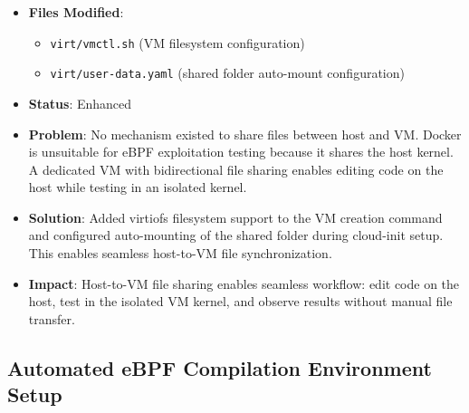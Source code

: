 \begin{itemize}
\item \textbf{Files Modified}:
\begin{itemize}
  \item \texttt{virt/vmctl.sh} (VM filesystem configuration)
  \item \texttt{virt/user-data.yaml} (shared folder auto-mount configuration)
\end{itemize}

\item \textbf{Status}: Enhanced

\item \textbf{Problem}: No mechanism existed to share files between host and VM. Docker is unsuitable for eBPF exploitation testing because it shares the host kernel. A dedicated VM with bidirectional file sharing enables editing code on the host while testing in an isolated kernel.

\item \textbf{Solution}: Added virtiofs filesystem support to the VM creation command and configured auto-mounting of the shared folder during cloud-init setup. This enables seamless host-to-VM file synchronization.

\item \textbf{Impact}: Host-to-VM file sharing enables seamless workflow: edit code on the host, test in the isolated VM kernel, and observe results without manual file transfer.
\end{itemize}

\subsection{Automated eBPF Compilation Environment Setup}

